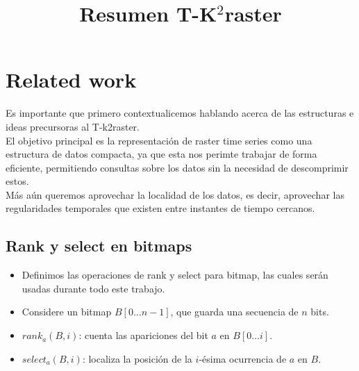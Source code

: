 \documentclass{article}
\title{Resumen T-K$^2$raster}
\author{}
\date{}
\begin{document}
\maketitle

\section*{Related work}
Es importante que primero contextualicemos hablando acerca de las estructuras e
ideas precursoras al T-k2raster.\\
El objetivo principal es la representación de raster time series como una
estructura de datos compacta, ya que esta nos perimte trabajar de forma eficiente,
permitiendo consultas sobre los datos sin la necesidad de descomprimir estos.\\
Más aún queremos aprovechar la localidad de los datos, es decir, aprovechar las
regularidades temporales que existen entre instantes de tiempo cercanos.

\subsection*{Rank y select en bitmaps}
\begin{itemize}
  \item Definimos las operaciones de rank y select para bitmap, las cuales serán
    usadas durante todo este trabajo.
  \item Considere un bitmap $B[0 \ldots n-1]$, que guarda una secuencia de $n$
    bits.
  \item $rank_a(B, i) $: cuenta las apariciones del bit $a$ en $B[0 \ldots i]$.
  \item $select_a(B,i)$: localiza la posición de la $i$-ésima ocurrencia de
    $a$ en $B$.
\end{itemize}
\end{document}
